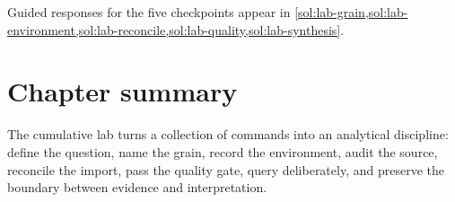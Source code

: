 Guided responses for the five checkpoints appear in
\cref{sol:lab-grain,sol:lab-environment,sol:lab-reconcile,sol:lab-quality,sol:lab-synthesis}.

\section{Chapter summary}

The cumulative lab turns a collection of commands into an analytical
discipline: define the question, name the grain, record the environment, audit
the source, reconcile the import, pass the quality gate, query deliberately,
and preserve the boundary between evidence and interpretation.
